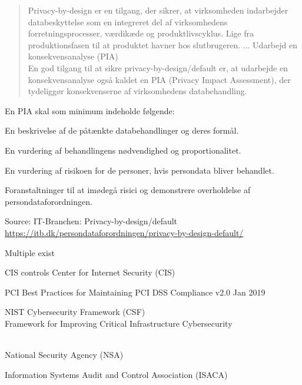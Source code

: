 \documentclass[Screen16to9,17pt]{foils}
\begin{document}

\begin{quote}\small
Privacy-by-design er en tilgang, der sikrer, at virksomheden indarbejder databeskyttelse som en integreret del af virksomhedens forretningsprocesser, værdikæde og produktlivscyklus. Lige fra produktionsfasen til at produktet havner hos slutbrugeren.
...
Udarbejd en konsekvensanalyse (PIA)\\
En god tilgang til at sikre privacy-by-design/default er, at udarbejde en konsekvensanalyse også kaldet en PIA (Privacy Impact Assessment), der tydeliggør konsekvenserne af virksomhedens databehandling.
\end{quote}

En PIA skal som minimum indeholde følgende:

\begin{list2}
\item En beskrivelse af de påtænkte databehandlinger og deres formål.
\item En vurdering af behandlingens nødvendighed og proportionalitet.
\item En vurdering af risikoen for de personer, hvis persondata bliver behandlet.
\item Foranstaltninger til at imødegå risici og demonstrere overholdelse af persondataforordningen.
\end{list2}

Source: IT-Branchen: Privacy-by-design/default\\ \url{https://itb.dk/persondataforordningen/privacy-by-design-default/}



\begin{list1}
\item Multiple exist
\vskip 1cm
\begin{list2}
\item CIS controls Center for Internet Security (CIS) 
\item PCI Best Practices for Maintaining PCI DSS Compliance v2.0 Jan 2019
\item NIST Cybersecurity Framework (CSF)\\
Framework for Improving
Critical Infrastructure Cybersecurity\\ \\
\item National Security Agency (NSA)\\ 
\item Information Systems Audit and Control Association (ISACA)\\
\end{list2}
\end{list1}
\end{document}
